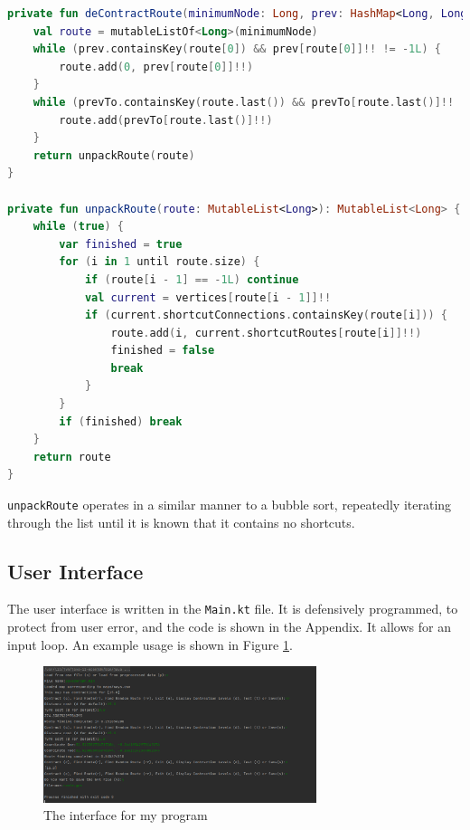 \documentclass[11pt,twoside,a4paper]{article}
\begin{document}
\begin{lstlisting}[language=kotlin]
private fun deContractRoute(minimumNode: Long, prev: HashMap<Long, Long>, prevTo: HashMap<Long, Long>): List<Long> {
    val route = mutableListOf<Long>(minimumNode)
    while (prev.containsKey(route[0]) && prev[route[0]]!! != -1L) {
        route.add(0, prev[route[0]]!!)
    }
    while (prevTo.containsKey(route.last()) && prevTo[route.last()]!! != -1L) {
        route.add(prevTo[route.last()]!!)
    }
    return unpackRoute(route)
}

private fun unpackRoute(route: MutableList<Long>): MutableList<Long> {
    while (true) {
        var finished = true
        for (i in 1 until route.size) {
            if (route[i - 1] == -1L) continue
            val current = vertices[route[i - 1]]!!
            if (current.shortcutConnections.containsKey(route[i])) {
                route.add(i, current.shortcutRoutes[route[i]]!!)
                finished = false
                break
            }
        }
        if (finished) break
    }
    return route
}
\end{lstlisting}
\texttt{unpackRoute} operates in a similar manner to a bubble sort, repeatedly iterating through the list until it is known that it contains no shortcuts. 
\subsection{User Interface}
The user interface is written in the \texttt{Main.kt} file. It is defensively programmed, to protect from user error, and the code is shown in the Appendix. It allows for an input loop. An example usage is shown in Figure \ref{interface}.
\begin{figure}[t]
\begin{center}
\includegraphics[width=8cm]{interface.png}
\end{center}
\caption{The interface for my program}
\label{interface}
\end{figure}
\newpage
\end{document}
